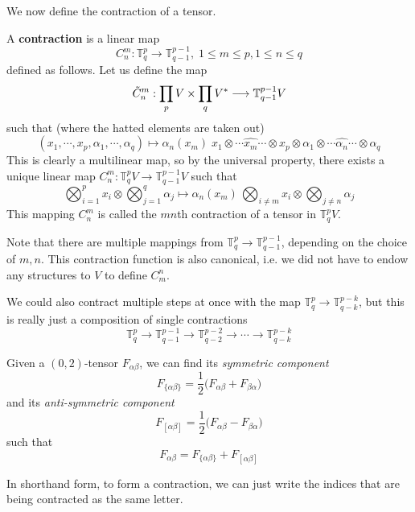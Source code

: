   We now define the contraction of a tensor. 

  \begin{definition}
    A \textbf{contraction} is a linear map
    \[C^m_n: \mathbb{T}^p_q \longrightarrow \mathbb{T}^{p-1}_{q-1}, \; 1 \leq m \leq p, 1 \leq n \leq q\]
    defined as follows. Let us define the map 
    \[\Tilde{C}^m_n: \prod_{p} V \times \prod_q V^* \longrightarrow \mathbb{T}^{p-1}_{q-1} V\]
    such that (where the hatted elements are taken out)
    \[ (x_1, \cdots, x_p, \alpha_1, \cdots, \alpha_q) \mapsto \alpha_n (x_m) \; x_1 \otimes \cdots \hat{x_m} \cdots \otimes x_p \otimes \alpha_1 \otimes \cdots \hat{\alpha_n} \cdots \otimes \alpha_q\]
    This is clearly a multilinear map, so by the universal property, there exists a unique linear map $C^m_n: \mathbb{T}^p_q V \longrightarrow \mathbb{T}^{p-1}_{q-1} V$ such that 
    \[ \bigotimes_{i=1}^p x_i \otimes \bigotimes_{j=1}^q \alpha_j \mapsto \alpha_n (x_m) \, \bigotimes_{i \neq m} x_i \otimes \bigotimes_{j \neq n} \alpha_j\]
    This mapping $C^m_n$ is called the $m n$th contraction of a tensor in $\mathbb{T}^p_q V$. 
  \end{definition}

  Note that there are multiple mappings from $\mathbb{T}^p_q \longrightarrow \mathbb{T}^{p-1}_{q-1}$, depending on the choice of $m, n$. This contraction function is also canonical, i.e. we did not have to endow any structures to $V$ to define $C^n_m$. 

  We could also contract multiple steps at once with the map $\mathbb{T}^p_q \longrightarrow \mathbb{T}^{p-k}_{q-k}$, but this is really just a composition of single contractions 
  \[\mathbb{T}^p_q \longrightarrow \mathbb{T}^{p-1}_{q-1} \longrightarrow \mathbb{T}^{p-2}_{q-2} \longrightarrow \cdots \longrightarrow \mathbb{T}^{p-k}_{q-k} \]

  \begin{definition}
    Given a $(0, 2)$-tensor $F_{\alpha \beta}$, we can find its \textit{symmetric component}
    \[ F_{ \{ \alpha \beta\}} = \frac{1}{2} \big(F_{\alpha \beta} + F_{\beta \alpha} \big)\]
    and its \textit{anti-symmetric component}
    \[ F_{ [ \alpha \beta]} = \frac{1}{2} \big(F_{\alpha \beta} - F_{\beta \alpha} \big)\]
    such that 
    \[ F_{\alpha \beta} = F_{ \{ \alpha \beta \}} + F_{[\alpha \beta]}\]
  \end{definition}

  In shorthand form, to form a contraction, we can just write the indices that are being contracted as the same letter. 

